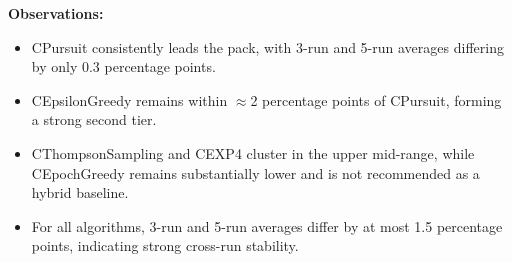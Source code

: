 \documentclass[12pt,a4paper]{article}
\begin{document}
\begin{tcolorbox}[colback=performancecolor!10,colframe=performancecolor,title=\textbf{Primary Performance Results (Aggregated Across Capacities, Environments, and Regimes)}]
\textbf{Observations:}
\begin{itemize}
\item CPursuit consistently leads the pack, with 3-run and 5-run averages differing by only 0.3 percentage points.
\item CEpsilonGreedy remains within $\approx$2 percentage points of CPursuit, forming a strong second tier.
\item CThompsonSampling and CEXP4 cluster in the upper mid-range, while CEpochGreedy remains substantially lower and is not recommended as a hybrid baseline.
\item For all algorithms, 3-run and 5-run averages differ by at most 1.5 percentage points, indicating strong cross-run stability.
\end{itemize}

\end{tcolorbox}
\end{document}
